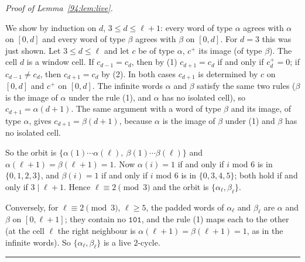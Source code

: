 \documentclass[10pt,a4paper]{article}
\newcommand{\qedmark}{\rule{1.1ex}{1.1ex}}
\newenvironment{proof}[1][Proof]{\par\smallskip\noindent\textit{#1.}\ }{\hfill\qedmark\par\smallskip}
\newcommand{\code}[1]{\mathtt{#1}}            %
\begin{document}
\begin{proof}[Proof of Lemma~\ref{94:lem:live}]
\begin{enumerate}[label=(\arabic*),leftmargin=*,nosep]
We show by induction on $d$, $3\le d\le\ell+1$: every word of type $\alpha$ agrees with $\alpha$ on $[0,d]$ and
every word of type $\beta$ agrees with $\beta$ on $[0,d]$. For $d=3$ this was just shown. Let $3\le d\le\ell$ and
let $c$ be of type $\alpha$, $c^{+}$ its image (of type $\beta$). The cell $d$ is a window cell. If
$c_{d-1}=c_d$, then by (1) $c_{d+1}=c_d$ if and only if $c^{+}_d=0$; if $c_{d-1}\ne c_d$, then $c_{d+1}=c_d$ by
(2). In both cases $c_{d+1}$ is determined by $c$ on $[0,d]$ and $c^{+}$ on $[0,d]$. The infinite words $\alpha$
and $\beta$ satisfy the same two rules ($\beta$ is the image of $\alpha$ under the rule (1), and $\alpha$ has no
isolated cell), so $c_{d+1}=\alpha(d+1)$. The same argument with a word of type $\beta$ and its image, of type
$\alpha$, gives $c_{d+1}=\beta(d+1)$, because $\alpha$ is the image of $\beta$ under (1) and $\beta$ has no
isolated cell.

So the orbit is $\{\alpha(1)\cdots\alpha(\ell),\ \beta(1)\cdots\beta(\ell)\}$ and
$\alpha(\ell+1)=\beta(\ell+1)=1$. Now $\alpha(i)=1$ if and only if $i$ mod $6$ is in $\{0,1,2,3\}$, and
$\beta(i)=1$ if and only if $i$ mod $6$ is in $\{0,3,4,5\}$; both hold if and only if $3\mid\ell+1$. Hence
$\ell\equiv2\pmod3$ and the orbit is $\{\alpha_\ell,\beta_\ell\}$.

Conversely, for $\ell\equiv2\pmod3$, $\ell\ge5$, the padded words of $\alpha_\ell$ and $\beta_\ell$ are $\alpha$
and $\beta$ on $[0,\ell+1]$; they contain no $\code{101}$, and the rule (1) maps each to the other (at the cell
$\ell$ the right neighbour is $\alpha(\ell+1)=\beta(\ell+1)=1$, as in the infinite words). So
$\{\alpha_\ell,\beta_\ell\}$ is a live $2$-cycle.
\end{enumerate}
\end{proof}
\end{document}
